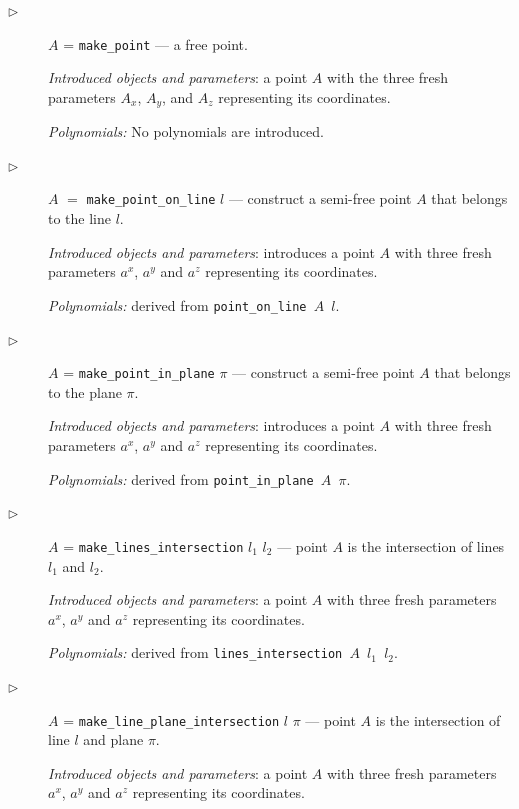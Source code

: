 \documentclass[final,1p,times,authoryear]{elsarticle}
\begin{document}
\begin{description}

\item[$\triangleright$] $A$ = {\tt make\_point} --- a free point.

  {\em Introduced objects and parameters}: a point $A$ with the three
  fresh parameters $A_x$, $A_y$, and $A_z$ representing its
  coordinates.

  {\em Polynomials:} No polynomials are introduced.

\item[$\triangleright$] $A$ $=$ {\tt make\_point\_on\_line} $l$ ---
  construct a semi-free point $A$ that belongs to the line $l$.
  
  {\em Introduced objects and parameters}: introduces a point $A$ with
  three fresh parameters $a^x$, $a^y$ and $a^z$ representing its
  coordinates.

  {\em Polynomials:} derived from {\tt point\_on\_line $A$ $l$}.

\item[$\triangleright$] $A$ = {\tt make\_point\_in\_plane} $\pi$ ---
  construct a semi-free point $A$ that belongs to the plane $\pi$.

  {\em Introduced objects and parameters}: introduces a point $A$ with
  three fresh parameters $a^x$, $a^y$ and $a^z$ representing its
  coordinates.
  
  {\em Polynomials:} derived from {\tt point\_in\_plane $A$ $\pi$}.

\item[$\triangleright$] $A$ = {\tt make\_lines\_intersection} $l_1$
  $l_2$ --- point $A$ is the intersection of lines $l_1$ and $l_2$.

  {\em Introduced objects and parameters}: a point $A$ with three
  fresh parameters $a^x$, $a^y$ and $a^z$ representing its
  coordinates.

  {\em Polynomials:} derived from {\tt lines\_intersection $A$ $l_1$ $l_2$}.

\item[$\triangleright$] $A$ = {\tt make\_line\_plane\_intersection}
  $l$ $\pi$ --- point $A$ is the intersection of line $l$ and plane
  $\pi$.

  {\em Introduced objects and parameters}: a point $A$ with three
  fresh parameters $a^x$, $a^y$ and $a^z$ representing its
  coordinates.


\end{description}
\end{document}

